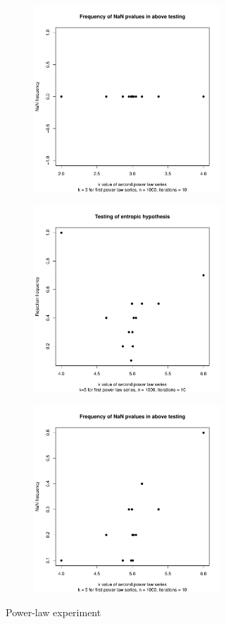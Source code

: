 \begin{figure}
\begin{subfigure}[b]{0.3\textwidth}
    \end{subfigure}
    \hfill
    \begin{subfigure}[b]{0.5\textwidth}
        \centering
        \includegraphics[height=7cm,keepaspectratio]{../../powerlaw/NaNPlot,k1=3,n=1000,iterations=10.pdf}
    \end{subfigure}
    \vfill
    \begin{subfigure}[b]{0.3\textwidth}
        \centering
        \includegraphics[height=7cm,keepaspectratio]{../../powerlaw/rejectionPlot,k1=5,n=1000,iterations=10.pdf}
    \end{subfigure}
    \hfill
    \begin{subfigure}[b]{0.5\textwidth}
        \centering
        \includegraphics[height=7cm,keepaspectratio]{../../powerlaw/NaNPlot,k1=5,n=1000,iterations=10.pdf}
    \end{subfigure}
    \caption{Power-law experiment}
\end{figure}

